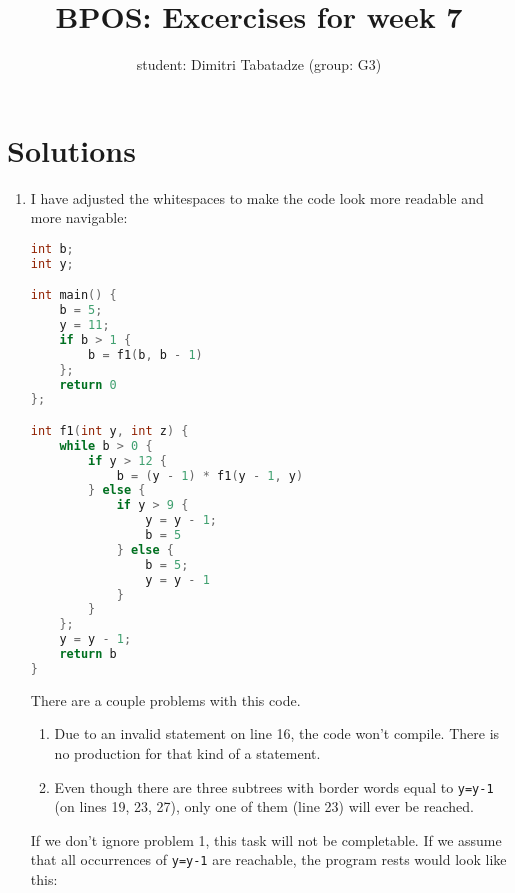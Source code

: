 \documentclass{article}
\title{BPOS: Excercises for week 7}
\author{student: Dimitri Tabatadze (group: G3)}
\begin{document}
    \maketitle
	\pagebreak

    \section*{Solutions}

    \begin{enumerate}
        \item {
            I have adjusted the whitespaces to make the code look more readable and more navigable:

            \begin{lstlisting}[language=c]
int b;
int y;

int main() {
    b = 5;
    y = 11;
    if b > 1 {
        b = f1(b, b - 1)
    };
    return 0
};

int f1(int y, int z) {
    while b > 0 { 
        if y > 12 {
            b = (y - 1) * f1(y - 1, y)
        } else {
            if y > 9 {
                y = y - 1;
                b = 5
            } else {
                b = 5;
                y = y - 1
            }
        }
    };
    y = y - 1;
    return b
}\end{lstlisting}
			
			There are a couple problems with this code.

			\begin{enumerate}[label={\arabic*.}]
				\item Due to an invalid statement on line 16, the code won't compile. There is no production for that kind of a statement.
				\item {Even though there are three subtrees with border words equal to \verb|y=y-1| (on lines 19, 23, 27), only one of them (line 23) will ever be reached.}
			\end{enumerate}

			If we don't ignore problem 1, this task will not be completable.
			If we assume that all occurrences of \verb|y=y-1| are reachable, the program rests would look like this:

}
\end{enumerate}
\end{document}

